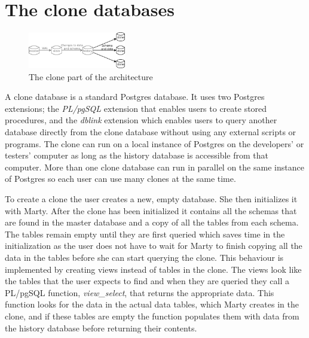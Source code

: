 \section{The clone databases}
\label{sec:clones}

\begin{figure}
  \vspace{-20pt}
  \begin{center}
    \includegraphics[width=0.38\textwidth]{img/architecture-clones}
  \end{center}
  \vspace{-20pt}
  \caption{The clone part of the architecture}
  \vspace{-10pt}
\end{figure}

A clone database is a standard Postgres database.
It uses two Postgres extensions; the \textit{PL/pgSQL} extension that enables users to create stored procedures, and the \textit{dblink} extension which enables users to query another database directly from the clone database without using any external scripts or programs.
The clone can run on a local instance of Postgres on the developers' or testers' computer as long as the history database is accessible from that computer.
More than one clone database can run in parallel on the same instance of Postgres so each user can use many clones at the same time.

To create a clone the user creates a new, empty database.
She then initializes it with Marty.
After the clone has been initialized it contains all the schemas that are found in the master database and a copy of all the tables from each schema.
The tables remain empty until they are first queried which saves time in the initialization as the user does not have to wait for Marty to finish copying all the data in the tables before she can start querying the clone.
This behaviour is implemented by creating views instead of tables in the clone.
The views look like the tables that the user expects to find and when they are queried they call a PL/pgSQL function, \textit{view\_select}, that returns the appropriate data.
This function looks for the data in the actual data tables, which Marty creates in the clone, and if these tables are empty the function populates them with data from the history database before returning their contents.

